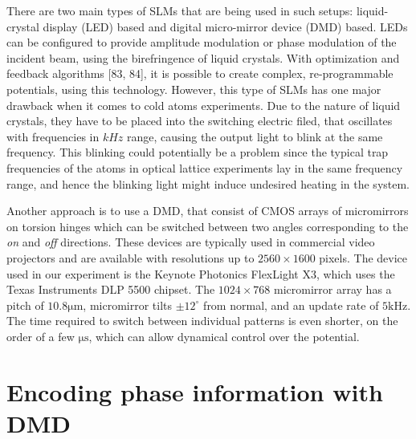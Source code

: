 There are two main types of SLMs that are being used in such setups: liquid-crystal display (LED) based and digital micro-mirror device (DMD) based. LEDs can be configured to provide amplitude modulation or phase modulation of the incident beam, using the birefringence of liquid crystals. With optimization and feedback algorithms [83, 84], it is possible to create complex, re-programmable potentials, using this technology. However, this type of SLMs has one major drawback when it comes to cold atoms experiments. Due to the nature of liquid crystals, they have to be placed into the switching electric filed, that oscillates with frequencies in $kHz$ range, causing the output light to blink at the same frequency. This blinking could potentially be a problem since the typical trap frequencies of the atoms in optical lattice experiments lay in the same frequency range, and hence the blinking light might induce undesired heating in the system.

Another approach is to use a DMD, that consist of CMOS arrays of micromirrors on torsion hinges which can be switched
between two angles corresponding to the \textit{on} and \textit{off} directions. These devices are typically used in commercial video projectors and are available with resolutions up to $2560 \times 1600$ pixels. The device used in our experiment is the Keynote Photonics FlexLight X3, which uses the Texas Instruments DLP 5500 chipset. The $1024 \times 768$ micromirror array has a pitch of $10.8 \mathrm{\mu m}$, micromirror tilts $\pm 12^{\circ}$ from normal, and an update rate of $5 \mathrm{kHz}$. The time required to switch between individual patterns is even shorter, on the order of a few $\mathrm{\mu s}$, which can allow dynamical control over the potential.

\section{Encoding phase information with DMD}

